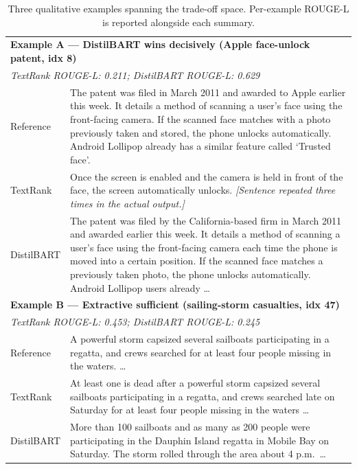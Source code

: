\documentclass[11pt,a4paper]{article}
\begin{document}
\begin{table}[H]
\centering
\caption{Three qualitative examples spanning the trade-off space.
Per-example ROUGE-L is reported alongside each summary.}
\label{tab:q3-qualitative}
\renewcommand{\arraystretch}{1.2}
\small
\begin{tabular}{p{} p{}}
\toprule
\multicolumn{2}{l}{\textbf{Example A — DistilBART wins decisively (Apple face-unlock patent, idx 8)}} \\
\multicolumn{2}{l}{\textit{TextRank ROUGE-L: 0.211; DistilBART ROUGE-L: 0.629}} \\
\midrule
Reference & The patent was filed in March 2011 and awarded to Apple earlier this week. It details a method of scanning a user's face using the front-facing camera. If the scanned face matches with a photo previously taken and stored, the phone unlocks automatically. Android Lollipop already has a similar feature called `Trusted face'. \\
TextRank  & Once the screen is enabled and the camera is held in front of the face, the screen automatically unlocks. \emph{[Sentence repeated three times in the actual output.]} \\
DistilBART & The patent was filed by the California-based firm in March 2011 and awarded earlier this week. It details a method of scanning a user's face using the front-facing camera each time the phone is moved into a certain position. If the scanned face matches a previously taken photo, the phone unlocks automatically. Android Lollipop users already \ldots \\
\midrule
\multicolumn{2}{l}{\textbf{Example B — Extractive sufficient (sailing-storm casualties, idx 47)}} \\
\multicolumn{2}{l}{\textit{TextRank ROUGE-L: 0.453; DistilBART ROUGE-L: 0.245}} \\
\midrule
Reference & A powerful storm capsized several sailboats participating in a regatta, and crews searched for at least four people missing in the waters. \ldots \\
TextRank  & At least one is dead after a powerful storm capsized several sailboats participating in a regatta, and crews searched late on Saturday for at least four people missing in the waters \ldots \\
DistilBART & More than 100 sailboats and as many as 200 people were participating in the Dauphin Island regatta in Mobile Bay on Saturday. The storm rolled through the area about 4 p.m.\ \ldots \\

\end{tabular}
\end{table}
\end{document}
